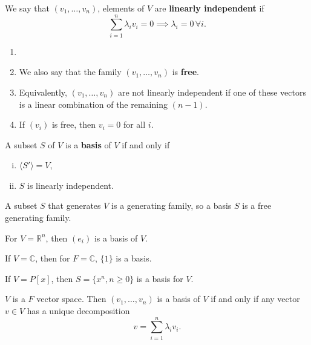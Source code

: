\documentclass[12pt]{article}
\begin{document}
\begin{definition}[Independence]
	We say that $(v_1, \ldots, v_n)$, elements of $V$ are \textbf{linearly independent} if
	\[
	\sum_{i = 1}^{n} \lambda_i v_i = 0 \implies \lambda_i = 0 \, \forall i
	.\]
\end{definition}

\begin{remark}
	\begin{enumerate}[1.]
		\item[]
		\item We also say that the family $(v_1, \ldots, v_n)$ is \textbf{free}.
		\item Equivalently, $(v_1, \ldots, v_n)$ are not linearly independent if one of these vectors is a linear combination of the remaining $(n-1)$.
		\item If $(v_i)$ is free, then $v_i = 0$ for all $i$.
	\end{enumerate}
	
\end{remark}

\begin{definition}[Basis]
	A subset $S$ of $V$ is a \textbf{basis} of $V$ if and only if
	\begin{enumerate}[(i)]
		\item $\langle S' \rangle = V$,
		\item $S$ is linearly independent.
	\end{enumerate}
	
\end{definition}

\begin{remark}
	A subset $S$ that generates $V$ is a generating family, so a basis $S$ is a free generating family.
\end{remark}

\begin{exbox}
	For $V = \mathbb{R}^{n}$, then $(e_i)$ is a basis of $V$.

	If $V = \mathbb{C}$, then for $F = \mathbb{C}$, $\{1\}$ is a basis.

	If $V = P[x]$, then $S = \{x^{n}, n \geq 0\}$ is a basis for $V$.

\end{exbox}

\begin{lemma}
	$V$ is a $F$ vector space. Then $(v_1, \ldots, v_n)$ is a basis of $V$ if and only if any vector $v \in V$ has a unique decomposition
	\[
	v = \sum_{i = 1}^{n} \lambda_i v_i
	.\]
\end{lemma}
\end{document}
